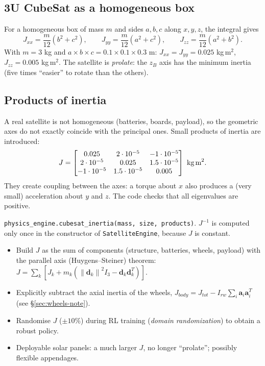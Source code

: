 \documentclass[11pt,a4paper]{article}
\newcommand{\vect}[1]{\bm{#1}}
\newcommand{\norm}[1]{\left\lVert #1 \right\rVert}
\newcommand{\code}[1]{\texttt{#1}}
\begin{document}
\subsection{3U CubeSat as a homogeneous box}
For a homogeneous box of mass $m$ and sides $a,b,c$ along $x,y,z$,
the integral gives
\begin{equation}
  J_{xx}=\frac{m}{12}(b^2+c^2),\qquad
  J_{yy}=\frac{m}{12}(a^2+c^2),\qquad
  J_{zz}=\frac{m}{12}(a^2+b^2).
\end{equation}
With $m=3$ kg and $a\times b\times c = 0.1\times0.1\times0.3$ m:
$J_{xx}=J_{yy}=0.025$ kg\,m$^2$, $J_{zz}=0.005$ kg\,m$^2$. The satellite is
\emph{prolate}: the $z_B$ axis has the minimum inertia (five times ``easier''
to rotate than the others).

\subsection{Products of inertia}
A real satellite is not homogeneous (batteries, boards, payload), so the
geometric axes do not exactly coincide with the principal ones. Small
products of inertia are introduced:
\begin{equation}
J=\begin{bmatrix}
0.025 & 2\cdot10^{-5} & -1\cdot10^{-5}\\
2\cdot10^{-5} & 0.025 & 1.5\cdot10^{-5}\\
-1\cdot10^{-5} & 1.5\cdot10^{-5} & 0.005
\end{bmatrix}\ \text{kg\,m}^2 .
\end{equation}
They create coupling between the axes: a torque about $x$ also produces a
(very small) acceleration about $y$ and $z$. The code checks that all
eigenvalues are positive.

\begin{incode}
\code{physics\_engine.cubesat\_inertia(mass, size, products)}. $J^{-1}$ is
computed only once in the constructor of \code{SatelliteEngine}, because $J$
is constant.
\end{incode}

\begin{improvement}
\begin{itemize}[nosep]
  \item Build $J$ as the sum of components (structure, batteries, wheels,
        payload) with the parallel axis (Huygens--Steiner) theorem:
        $J = \sum_k \left[J_k + m_k(\norm{\vect d_k}^2 I_3 - \vect d_k\vect d_k^T)\right]$.
  \item Explicitly subtract the axial inertia of the wheels,
        $J_{body} = J_{tot} - I_{rw}\sum_i \vect a_i\vect a_i^T$ (see \S\ref{sec:wheels-note}).
  \item Randomise $J$ ($\pm 10\%$) during RL training
        (\emph{domain randomization}) to obtain a robust policy.
  \item Deployable solar panels: a much larger $J$, no longer
        ``prolate''; possibly flexible appendages.
\end{itemize}
\end{improvement}
\end{document}
